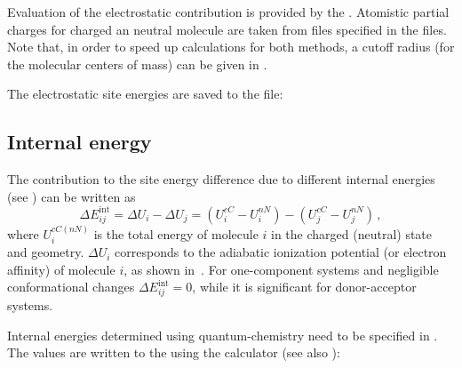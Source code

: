 Evaluation of the electrostatic contribution is provided by the  \calculator. Atomistic partial charges for charged an neutral molecule are taken from files specified in the \xmlcsg files. Note that, in order to speed up calculations for both methods, a cutoff radius (for the molecular centers of mass) can be given in  \xmloptions.

The electrostatic site energies are saved to the \sqlstate file:

\subsection{Internal energy}
\label{sec:internal_energy}

The contribution to the site energy difference due to different internal energies (see ) can be written as
\begin{equation}
 \Delta E_{ij}^\text{int}=
\Delta U_i - \Delta U_j = \left( U_{i}^{cC}-U_{i}^{nN}\right) - \left( U_{j}^{cC}-U_{j}^{nN}\right) \, ,
\label{equ:conformational}
\end{equation}
where $U_{i}^{cC(nN)}$ is the total energy of molecule $i$ in the charged (neutral) state and geometry.  $\Delta U_{i}$ corresponds to the adiabatic ionization potential (or electron affinity) of molecule $i$, as shown in~. For one-component systems and negligible conformational changes $ \Delta E_{ij}^\text{int}=0$, while it is significant for donor-acceptor systems. 

Internal energies determined using quantum-chemistry need to be specified in \xmlcsg. The values are written to the \sqlstate using the calculator  (see also ):
